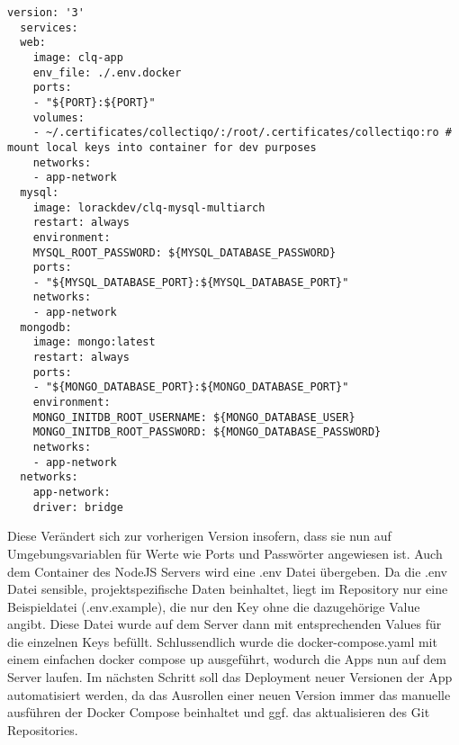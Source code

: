 \lstset{language=yaml}
\begin{lstlisting}[label={lst:lst-docker-compose-yaml}]
  version: '3'
  services:
  web:
    image: clq-app
    env_file: ./.env.docker
    ports:
    - "${PORT}:${PORT}"
    volumes:
    - ~/.certificates/collectiqo/:/root/.certificates/collectiqo:ro # mount local keys into container for dev purposes
    networks:
    - app-network
  mysql:
    image: lorackdev/clq-mysql-multiarch
    restart: always
    environment:
    MYSQL_ROOT_PASSWORD: ${MYSQL_DATABASE_PASSWORD}
    ports:
    - "${MYSQL_DATABASE_PORT}:${MYSQL_DATABASE_PORT}"
    networks:
    - app-network
  mongodb:
    image: mongo:latest
    restart: always
    ports:
    - "${MONGO_DATABASE_PORT}:${MONGO_DATABASE_PORT}"
    environment:
    MONGO_INITDB_ROOT_USERNAME: ${MONGO_DATABASE_USER}
    MONGO_INITDB_ROOT_PASSWORD: ${MONGO_DATABASE_PASSWORD}
    networks:
    - app-network
  networks:
    app-network:
    driver: bridge
\end{lstlisting}


Diese Verändert sich zur vorherigen Version insofern, dass sie nun auf Umgebungsvariablen für Werte wie Ports und Passwörter angewiesen ist.
Auch dem Container des NodeJS Servers wird eine .env Datei übergeben.
Da die .env Datei sensible, projektspezifische Daten beinhaltet, liegt im Repository nur eine Beispieldatei (.env.example), die nur den Key ohne die dazugehörige Value angibt.
Diese Datei wurde auf dem Server dann mit entsprechenden Values für die einzelnen Keys befüllt.
Schlussendlich wurde die docker-compose.yaml mit einem einfachen docker compose up ausgeführt, wodurch die Apps nun auf dem Server laufen.
Im nächsten Schritt soll das Deployment neuer Versionen der App automatisiert werden, da das Ausrollen einer neuen Version immer das manuelle ausführen der Docker Compose beinhaltet und ggf. das aktualisieren des Git Repositories.
